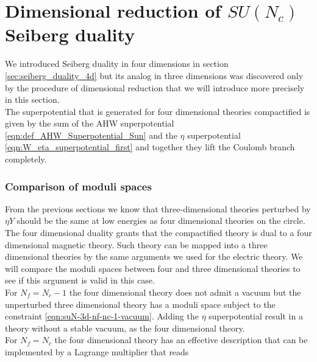 \section{Dimensional reduction of $SU(N_c)$ Seiberg duality}
We introduced Seiberg duality in four dimensions in section \ref{sec:seiberg_duality_4d} but its analog in three dimensions was discovered only by the procedure of dimensional reduction that we will introduce more precisely in this section.\\
The superpotential that is generated for four dimensional theories compactified is given by the sum of the AHW superpotential \eqref{eqn:def_AHW_Superpotential_Sun} and the $\eta$ superpotential \eqref{eqn:W_eta_superpotential_first} and together they lift the Coulomb branch completely.

\subsubsection{Comparison of moduli spaces}
\begin{comment}
For $N_f = N_c$ it can be described by the effective superpotential
\begin{equation}
 W=  \lambda \left( B \tilde{B} - \Det{(M)} +    \right)
\end{equation}
which modifies the Higgs branch and lifts the Coulomb branch.
For greater number of flavours the Higgs branch remains identical while the Coulomb branch remains lifted.\\
\end{comment}
From the previous sections we know that three-dimensional theories perturbed by $\eta Y$ should be the same at low energies as four dimensional theories on the circle. 
The four dimensional duality grants that the compactified theory is dual to a four dimensional magnetic theory. 
Such theory can be mapped into a three dimensional theories by the same arguments we used for the electric theory.  
We will compare the moduli spaces between four and three dimensional theories to see if this argument is valid in this case.\\
For $N_f = N_c -1$ the four dimensional theory does not admit a vacuum but the unperturbed three dimensional theory has a moduli space subject to the constraint \eqref{eqn:suN-3d-nf-nc-1-vacuum}.
Adding the $\eta$ superpotential result in a theory without a stable vacuum, as the four dimensional theory.\\
For $N_f = N_c$ the four dimensional theory has an effective description that can be implemented by a Lagrange multiplier that reads
